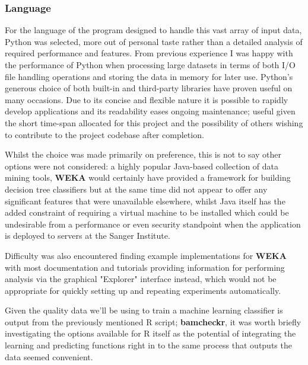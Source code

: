 \subsubsection{Language}
For the language of the program designed to handle this vast array of input
data, Python was selected, more out of personal taste rather than a
detailed analysis of required performance and features. From previous experience
I was happy with the performance of Python when processing large datasets in
terms of both I/O file handling operations and storing the data in memory for
later use. Python's generous choice of both built-in and third-party libraries
have proven useful on many occasions. Due to its concise and flexible nature it
is possible to rapidly develop applications and its readability eases ongoing
maintenance; useful given the short time-span allocated for this project and the
possibility of others wishing to contribute to the project codebase after
completion.

Whilst the choice was made primarily on preference, this is not to say other
options were not considered: a highly popular Java-based collection of data
mining tools, \textbf{WEKA}\citep{weka} would certainly have provided a
framework for building decision tree classifiers but at the same time did not
appear to offer any significant features that were unavailable elsewhere, whilst
Java itself has the added constraint of requiring a virtual machine to be
installed which could be undesirable from a performance or even security
standpoint when the application is deployed to servers at the Sanger Institute.


Difficulty was also encountered finding example implementations for \textbf{WEKA}
with most documentation and tutorials providing information for performing
analysis via the graphical "Explorer" interface instead, which would not be
appropriate for quickly setting up and repeating experiments automatically.

Given the quality data we'll be using to train a machine learning classifier is
output from the previously mentioned R script; \textbf{bamcheckr}, it was worth
briefly investigating the options available for R itself as the potential of
integrating the learning and predicting functions right in to the same process
that outputs the data seemed convenient.

